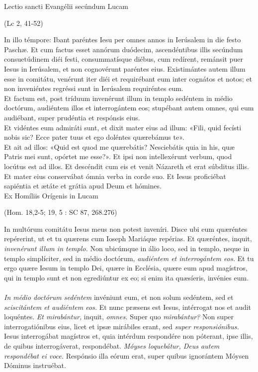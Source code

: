 \documentclass[options]{article}
\begin{document}
		Lectio sancti Evangélii secúndum Lucam
		\begin{flushright}
			(Lc 2, 41-52)
		\end{flushright}
In illo témpore:
Ibant paréntes Iesu per omnes annos in Ierúsalem in die festo Paschæ. Et cum factus esset annórum duódecim, ascendéntibus illis secúndum consuetúdinem diéi festi, consummatísque diébus, cum redírent, remánsit puer Iesus in Ierúsalem, et non cognovérunt paréntes eius. Existimántes autem illum esse in comitátu, venérunt iter diéi et requirébant eum inter cognátos et notos; et non inveniéntes regréssi sunt in Ierúsalem requiréntes eum.\\
Et factum est, post tríduum invenérunt illum in templo sedéntem in médio doctórum, audiéntem illos et interrogántem eos; stupébant autem omnes, qui eum audiébant, super prudéntia et respónsis eius.\\
Et vidéntes eum admiráti sunt, et dixit mater eius ad illum: «Fili, quid fecísti nobis sic? Ecce pater tuus et ego doléntes quærebámus te».\\
Et ait ad illos: «Quid est quod me quærebátis? Nesciebátis quia in his, quæ Patris mei sunt, opórtet me esse?».
Et ipsi non intellexérunt verbum, quod locútus est ad illos.
Et descéndit cum eis et venit Názareth et erat súbditus illis. Et mater eius conservábat ómnia verba in corde suo.
Et Iesus proficiébat sapiéntia et ætáte et grátia apud Deum et hómines.\
		\\	
Ex Homíliis Orígenis in Lucam
		\begin{flushright}
(Hom. 18,2-5; 19, 5 : SC 87, 268.276)
		\end{flushright}
In multórum comitátu Iesus meus non potest inveníri. Disce ubi eum quæréntes repérerint, ut et tu quærens cum Ioseph Mariáque repérias. Et quæréntes, inquit, \emph{invenérunt illum in templo.} Non ubicúmque in álio loco, sed in templo, neque in templo simplíciter, sed in médio doctórum, \emph{audiéntem et interrogántem eos.} Et tu ergo quære Iesum in templo Dei, quære in Ecclésia, quære eum apud magístros, qui in templo sunt et non egrediúntur ex eo; si enim ita quæsíeris, invénies eum.\\
\\	
\emph{In médio doctórum sedéntem} invéniunt eum, et non solum sedéntem, sed et \emph{sciscitántem et audiéntem eos.} Et nunc præsens est Iesus, intérrogat nos et audit loquéntes. \emph{Et mirabántur,} inquit, \emph{omnes.} Super quo \emph{mirabántur?} Non super interrogatiónibus eius, licet et ipsæ mirábiles erant, sed \emph{super responsiónibus.} Iesus interrogábat magístros et, quia intérdum respondére non póterant, ipse illis, de quibus interrogáverat, respondébat. \emph{Móyses loquebátur, Deus autem respondébat ei voce.} Respónsio illa eórum erat, super quibus ignorántem Móysen Dóminus instruébat.\\
\end{document}
